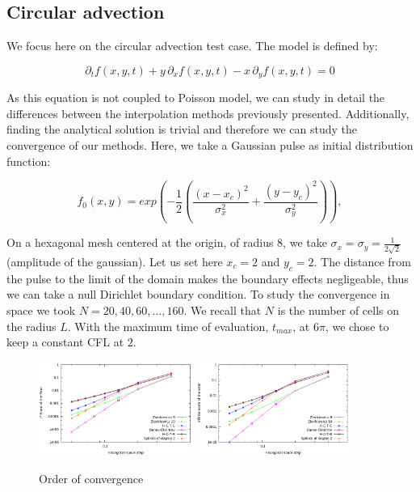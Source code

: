 \documentclass[proc]{edpsmath}
\begin{document}
\subsection{Circular advection}

We focus here on the circular advection test case. The model is defined by:

	\begin{equation}
		\partial_t f(x,y,t) + y\,\partial_x f(x,y,t) - x \,\partial_y f(x,y,t) = 0 
	\end{equation}

As this equation is not coupled to Poisson model, we can study in detail the differences between the interpolation methods previously presented.	Additionally, finding the analytical solution is trivial and therefore we can study the convergence of our methods. Here, we take a Gaussian pulse as initial distribution function:

	\begin{equation}
	 f_0(x,y) = exp  \left( -\dfrac{1}{2} \left( \dfrac{(x - x_c)^2}{\sigma_x^2} + \dfrac{(y - y_c)^2}{\sigma_y^2  } \right)   \right ), 
	\end{equation}

On a hexagonal mesh centered at the origin, of radius $8$,  we take  $\sigma_x = \sigma_y = \frac{1}{2\sqrt{2}}$ (amplitude of the gaussian). Let us set here $x_c = 2$ and $y_c = 2$. The distance from the pulse to the limit of the domain makes the boundary effects negligeable, thus we can take a null Dirichlet boundary condition.  To study the convergence in space we took $N = 20, 40, 60, ..., 160$. We recall that $N$ is the number of cells on the radius $L$. With the maximum time of evaluation, $t_{max}$, at $6 \pi$, we chose to keep a constant CFL at $2$.



\begin{figure}[h!]
	\includegraphics[width=0.45\textwidth]{figures/l2.png}
	\includegraphics[width=0.45\textwidth]{figures/inf_l.png}
	\caption{Order of convergence}
	\label{fig:circ_convergence}
\end{figure}
\end{document}
